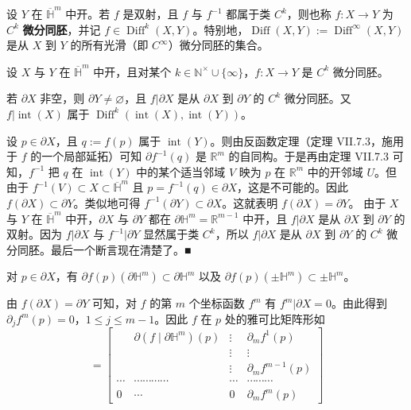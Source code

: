 设 $ Y $ 在 $ \overline{\mathbb{H}}^m $ 中开。若 $ f $ 是双射，且 $ f $ 与 $ f^{-1} $ 都属于类 $ C^k $，则也称 $ f : X \to Y $ 为 $ C^k $ \textbf{微分同胚}，并记 $ f \in \operatorname{Diff}^k(X,Y) $。特别地，$ \operatorname{Diff}(X,Y) := \operatorname{Diff}^{\infty}(X,Y) $ 是从 $ X $ 到 $ Y $ 的所有光滑（即 $ C^{\infty} $）微分同胚的集合。

\begin{remark}

设 $ X $ 与 $ Y $ 在 $ \overline{\mathbb{H}}^m $ 中开，且对某个 $ k \in \mathbb{N}^{\times}\cup\{\infty\} $，$ f : X \to Y $ 是 $ C^k $ 微分同胚。

\begin{items}
\item

若 $ \partial X $ 非空，则 $ \partial Y \neq \varnothing $，且 $ f|\partial X $ 是从 $ \partial X $ 到 $ \partial Y $ 的 $ C^k $ 微分同胚。又 $ f|\operatorname{int}(X) $ 属于 $ \operatorname{Diff}^k(\operatorname{int}(X),\operatorname{int}(Y)) $。

\proofhead
设 $ p \in \partial X $，且 $ q := f(p) $ 属于 $ \operatorname{int}(Y) $。则由反函数定理（定理 VII.7.3，施用于 $ f $ 的一个局部延拓）可知 $ \partial f^{-1}(q) $ 是 $ \mathbb{R}^m $ 的自同构。于是再由定理 VII.7.3 可知，$ f^{-1} $ 把 $ q $ 在 $ \operatorname{int}(Y) $ 中的某个适当邻域 $ V $ 映为 $ p $ 在 $ \mathbb{R}^m $ 中的开邻域 $ U $。但由于 $ f^{-1}(V) \subset X \subset \overline{\mathbb{H}}^m $ 且 $ p = f^{-1}(q) \in \partial X $，这是不可能的。因此 $ f(\partial X) \subset \partial Y $。类似地可得 $ f^{-1}(\partial Y) \subset \partial X $。这就表明 $ f(\partial X) = \partial Y $。
由于 $ X $ 与 $ Y $ 在 $ \overline{\mathbb{H}}^m $ 中开，$ \partial X $ 与 $ \partial Y $ 都在 $ \partial\mathbb{H}^m = \mathbb{R}^{m-1} $ 中开，且 $ f|\partial X $ 是从 $ \partial X $ 到 $ \partial Y $ 的双射。因为 $ f|\partial X $ 与 $ f^{-1}|\partial Y $ 显然属于类 $ C^k $，所以 $ f|\partial X $ 是从 $ \partial X $ 到 $ \partial Y $ 的 $ C^k $ 微分同胚。最后一个断言现在清楚了。\nobreak\hspace{0.35em}■
\item

对 $ p \in \partial X $，有 $ \partial f(p)(\partial\mathbb{H}^m) \subset \partial\mathbb{H}^m $ 以及 $ \partial f(p)(\pm\mathbb{H}^m) \subset \pm\mathbb{H}^m $。

\proofhead
由 $ f(\partial X) = \partial Y $ 可知，对 $ f $ 的第 $ m $ 个坐标函数 $ f^m $ 有 $ f^m|\partial X = 0 $。由此得到 $ \partial_j f^m(p) = 0 $，$ 1 \le j \le m-1 $。因此 $ f $ 在 $ p $ 处的雅可比矩阵形如
\begin{equation}
[\partial f(p)] = \begin{bmatrix} & \partial(f\mid\partial\mathbb{H}^m)(p) & \vdots & \partial_m f^1(p) \\ & & \vdots & \vdots \\ & & \vdots & \partial_m f^{m-1}(p) \\ \cdots & \cdots\cdots\cdots\cdots & \cdots & \cdots\cdots\cdots \\ 0 & \cdots & 0 & \partial_m f^m(p) \end{bmatrix}\tag{1.7}
\end{equation}


\end{items}
\end{remark}
